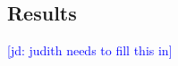 \documentclass[10pt,letterpaper]{article}
\newcommand{\jd}[1]{\textcolor{Blue}{[jd: #1]}}
\newcommand{\figref}[1]{Fig.~\ref{#1}}
\begin{document}
\subsection{\bf Results}

\jd{judith needs to fill this in}

\end{document}
